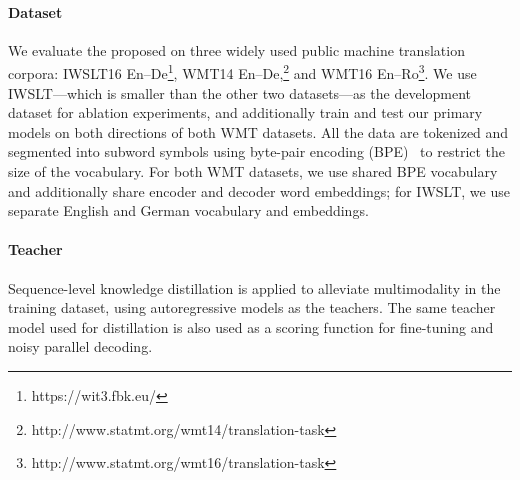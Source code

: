 \paragraph{Dataset} We evaluate the proposed \model{} on three widely used public machine translation corpora: IWSLT16 En--De\footnote{https://wit3.fbk.eu/}, WMT14 En--De,\footnote{http://www.statmt.org/wmt14/translation-task} and WMT16 En--Ro\footnote{http://www.statmt.org/wmt16/translation-task}. We use IWSLT---which is smaller than the other two datasets---as the development dataset for ablation experiments, and additionally train and test our primary models on both directions of both WMT datasets.
All the data are tokenized and segmented into subword symbols using byte-pair encoding (BPE)~\citep{sennrich2015neural} to restrict the size of the vocabulary. For both WMT datasets, we use shared BPE vocabulary and additionally share encoder and decoder word embeddings; for IWSLT, we use separate English and German vocabulary and embeddings.
\vspace{-5pt}
\paragraph{Teacher} Sequence-level knowledge distillation is applied to alleviate multimodality in the training dataset, using autoregressive models as the teachers. The same teacher model used for distillation is also used as a scoring function for fine-tuning and noisy parallel decoding.

